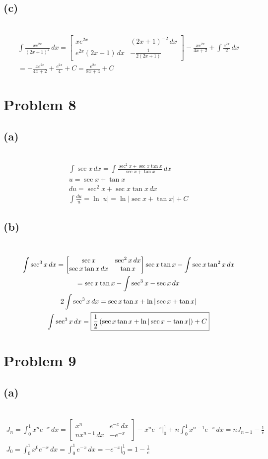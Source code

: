 \documentclass[12pt]{article}
\newcommand*{\paren}[1]{\ensuremath\left(#1\right)}
\newcommand{\problem}[1]{\section{Problem #1}}
\newcommand{\subproblem}[1]{\subsection{(#1)} \,}
\begin{document}
\subproblem{c}
\begin{gather*}
    \int \frac{xe^{2x}}{(2x+1)^2} \, dx =
    \begin{bmatrix}
        xe^{2x} & (2x+1)^{-2 } \, dx\\
        e^{2x}(2x+1)\, dx & - \frac{1}{2(2x+1)}
    \end{bmatrix}
    -\frac{xe^{2x}}{4x+2} + \int \frac{e^{2x}}{2} \, dx \\
    = -\frac{xe^{2x}}{4x+2} + \frac{e^{2x}}{4}+C = \boxed{\frac{e^{2x}}{8x+4} + C}
\end{gather*}

\problem{8}

\subproblem{a}
\begin{gather*}
    \int \sec x \, dx  = \int \frac{\sec^2 x+\sec x \tan x }{\sec x + \tan x }\, dx \\
    u=\sec x + \tan x\\
    du = \sec^2x +\sec x \tan x \, dx\\
    \int \frac{du}{u} = \ln |u|=\boxed{\ln |\sec x + \tan x | + C}
\end{gather*}

\subproblem{b}
\begin{gather*}
    \int \sec^3 x\, dx =
    \begin{bmatrix}
        \sec x & \sec^2x \, dx\\
        \sec x \tan x \, dx & \tan x
    \end{bmatrix}
    \sec x \tan x - \int \sec x \tan^2 x \, dx\\
    = \sec x \tan  x- \int \sec^3 x -\sec x \, dx\\
    2 \int \sec ^3 x\, dx= \sec x \tan x + \ln |\sec x + \tan x |\\
    \int \sec^3 x \,dx = \boxed{\frac{1}{2}\paren{\sec x \tan x + \ln | \sec x + \tan x |} +C}
\end{gather*}

\problem{9}

\subproblem{a}
\begin{gather*}
    J_n= \int _0^1 x^ne^{-x}\, dx = 
    \begin{bmatrix}
        x^n & e^{-x}\, dx\\
        nx^{n-1 }\, dx & -e^{-x}
    \end{bmatrix}
    -x^ne^{-x}\Big|^1_0 + n\int_0^1 x^{n-1}e^{-x}\,dx= \boxed{n J_{n-1} - \frac{1}{e}}\\
    J_0= \int_0^1  x^0 e^{-x}\, dx = \int_0^1 e^{-x}\, dx = -e^{-x} \Big|^1_0 = \boxed{1- \frac{1}{e}}
\end{gather*}
\end{document}
